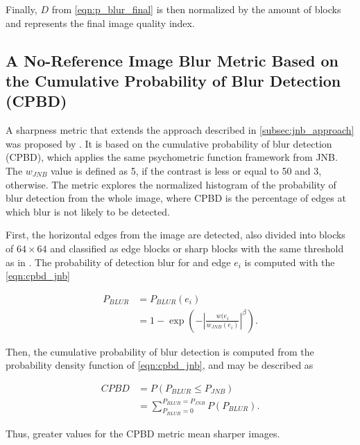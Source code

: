 \noindent Finally, $D$ from \autoref{eqn:p_blur_final} is then normalized by the amount of blocks and represents the final image quality index.

\subsection{A No-Reference Image Blur Metric Based on the Cumulative Probability of Blur Detection (CPBD)}

A sharpness metric that extends the approach described in \ref{subsec:jnb_approach} was proposed by . It is based on the cumulative probability of blur detection (CPBD), which applies the same psychometric function framework from JNB. The $w_{JNB}$ value is defined as 5, if the contrast is less or equal to 50 and 3, otherwise. The metric explores the normalized histogram of the probability of blur detection from the whole image, where CPBD is the percentage of edges at which blur is not likely to be detected.

First, the horizontal edges from the image are detected, also divided into blocks of $64 \times 64$ and classified as edge blocks or sharp blocks with the same threshold as in . The probability of detection blur for and edge $e_{i}$ is computed with the \autoref{eqn:cpbd_jnb}

\begin{equation}
\label{eqn:cpbd_jnb}
\begin{split}
    P_{BLUR} &= P_{BLUR}(e_{i})\\
    &= 1 - \exp{
    \left(
        - \left|
            \frac{w(e_{i}}{w_{JNB}(e_{i})}
        \right|^\beta
    \right)}.
\end{split}
\end{equation}

\noindent Then, the cumulative probability of blur detection is computed from the probability density function of \autoref{eqn:cpbd_jnb}, and may be described as

\begin{equation}
\label{eqn:cpbd}
\begin{split}
    CPBD &= P(P_{BLUR} \leq P_{JNB})\\
    &=\sum_{P_{BLUR} = 0}^{P_{BLUR} = P_{JNB}}P(P_{BLUR}).
\end{split}
\end{equation}

\noindent Thus, greater values for the CPBD metric mean sharper images.


